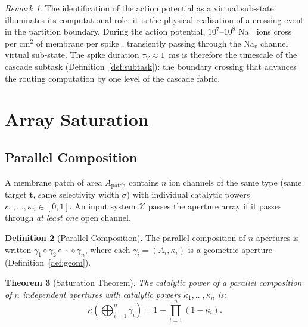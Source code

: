 \documentclass[11pt,twocolumn,a4paper]{article}
\newtheorem{theorem}{Theorem}[section]
\theoremstyle{definition}
\newtheorem{definition}[theorem]{Definition}
\theoremstyle{remark}
\newtheorem{remark}[theorem]{Remark}
\newcommand{\kap}{\kappa}
\begin{document}
\begin{remark}
The identification of the action potential as a virtual sub-state illuminates
its computational role: it is the physical realisation of a crossing event in
the partition boundary. During the action potential, $10^7$--$10^8$ Na$^+$
ions cross per cm$^2$ of membrane per spike \citep{hille2001}, transiently
passing through the Na$_v$ channel virtual sub-state. The spike duration
$\tau_V \approx 1$~ms is therefore the timescale of the cascade subtask
(Definition~\ref{def:subtask}): the boundary crossing that advances the
routing computation by one level of the cascade fabric.
\end{remark}

\section{Array Saturation}
\label{sec:saturation}

\subsection{Parallel Composition}

A membrane patch of area $A_{\mathrm{patch}}$ contains $n$ ion channels of the
same type (same target $\mathbf{t}$, same selectivity width $\sigma$) with
individual catalytic powers $\kap_1, \ldots, \kap_n \in [0,1]$. An input system
$\mathcal{X}$ passes the aperture array if it passes through \emph{at least one}
open channel.

\begin{definition}[Parallel Composition]
\label{def:parallel}
The parallel composition of $n$ apertures is written $\gamma_1 \diamond \gamma_2
\diamond \cdots \diamond \gamma_n$, where each $\gamma_i = (A_i, \kap_i)$ is a
geometric aperture (Definition~\ref{def:geom}).
\end{definition}

\begin{theorem}[Saturation Theorem]
\label{thm:saturation}
The catalytic power of a parallel composition of $n$ independent apertures
with catalytic powers $\kap_1, \ldots, \kap_n$ is:
\begin{equation}
\kap\!\left(\bigoplus_{i=1}^n \gamma_i\right)
= 1 - \prod_{i=1}^n (1 - \kap_i).
\label{eq:saturation}
\end{equation}
\end{theorem}
\end{document}
